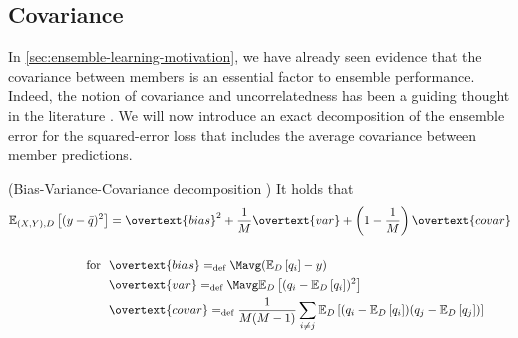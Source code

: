 \documentclass[../main.tex]{subfiles}
\begin{document}
\subsection{Covariance}
\label{sec:bias-variance-covariance}

In \cref{sec:ensemble-learning-motivation}, we have already seen evidence that the covariance between members is an essential factor to ensemble performance. Indeed, the notion of covariance and uncorrelatedness has been a guiding thought in the literature \cite{didaci_DiversityClassifierEnsembles_2013, brown_ManagingDiversityRegression_2005, buschjager_GeneralizedNegativeCorrelation_2020}.
We will now introduce an exact decomposition of the ensemble error for the squared-error loss that includes the average covariance between member predictions.
\begin{theorem} (Bias-Variance-Covariance decomposition \cite{ueda_GeneralizationErrorEnsemble_1996, brown_ManagingDiversityRegression_2005})
  \label{thm:bias-variance-covariance}
It holds that
$$
\begin{align}
\mathbb{E}_{(X,Y),D}\left[ (y - \bar{q})^2 \right]  &= \overtext{bias}^2 + \frac{1}{M} \overtext{var} + \left( 1 - \frac{1}{M} \right) \overtext{covar} \\ \\ 
\text{for} ~ ~ & \overtext{bias} =_{\text{def}} \Mavg (\mathbb{E}_{D}\left[ q_{i}  \right] - y) \\
& \overtext{var} =_{\text{def}} \Mavg \mathbb{E}_{D}\left[ (q_{i} - \mathbb{E}_{D}\left[ q_{i} \right])^2  \right]  \\
& \overtext{covar} =_{\text{def}} \frac{1}{M(M-1)} \sum_{i \not= j} \mathbb{E}_{D}\left[ (q_{i} - \mathbb{E}_{D}\left[ q_{i} \right] ) (q_{j} - \mathbb{E}_{D}\left[ q_{j} \right] ) \right] 
\end{align}
$$
\end{theorem}
\end{document}
